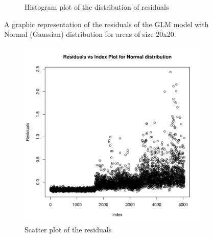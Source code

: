 \documentclass[12pt,a4paper,twoside]{article}
\begin{document}
\begin{figure}[!ht]
\begin{subfigure}{.45\textwidth}
        \caption{Histogram plot of the distribution of residuals}
        \label{fig:gaussianhist20}
    \end{subfigure}
    \caption{A graphic representation of the residuals of the GLM model with Normal (Gaussian)
    distribution for areas of size 20x20.}
    \label{fig:gaussianfig20}
\end{figure}

\begin{figure}[!ht]
    \begin{subfigure}{.45\textwidth}
        \centering
        \includegraphics[width=\linewidth]{img/Normal_distribution_40x40.pdf}
        \caption{Scatter plot of the residuals}
        \label{fig:gaussianscatter40}
    \end{subfigure}
    \begin{subfigure}{.45\textwidth}
        \centering

\end{subfigure}
\end{figure}
\end{document}
